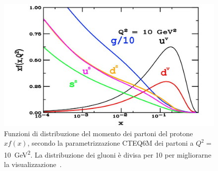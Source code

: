         \begin{figure}[h]
            \centering
            \includegraphics[width=0.71\linewidth]{res/fig/1-chapter/6-pdf-momentum-proton.jpg}
            \caption{Funzioni di distribuzione del momento dei partoni del protone $xf(x)$, secondo la parametrizzazione CTEQ6M dei partoni a $Q^2 =$ \qty{10}{\giga \eV^2}. La distribuzione dei gluoni è divisa per 10 per migliorarne la visualizzazione~\cite{Fusconi_2022}.}
            \label{fig:6-pdf-momentum-proton}
        \end{figure}

